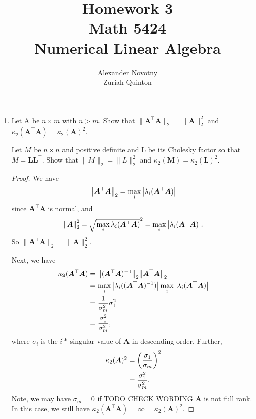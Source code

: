 \documentclass{article}
\title{Homework 3\\{\large Math 5424}\\{\large Numerical Linear Algebra}}
\author{Alexander Novotny\\Zuriah Quinton}
\theoremstyle{definition}
\newcommand{\mat}[1]{\bm{#1}}
\begin{document}
\maketitle

\begin{enumerate}[leftmargin=\labelsep]
	\item Let A be \(n \times m\) with \(n > m\). Show that \(\|\mat{A}^\top\mat{A}\|_2 = \|\mat{A}\|_2^2\) and \(\kappa_2 (\mat{A}^\top\mat{A}) = \kappa_2 (\mat{A})^2\).

	      Let \(M\) be \(n \times n\) and positive definite and L be its Cholesky factor so that \(M = \mat{L}\mat{L}^\top\). Show that \(\|M\|_2 = \|L\|_2^2\) and \(\kappa_2(\mat{M}) = \kappa_2(\mat{L})^2\).
	      \begin{proof}
				We have 
				\begin{equation*}
					\norm{\mat{A}^\top \mat{A}}_2 = \max_i \abs{ \lambda_i(\mat{A}^\top \mat{A}) } %
				\end{equation*}
				since \(\mat{A}^\top \mat{A}\) is normal, and
				\begin{equation*}
					\norm{\mat{A}}^2_2 = \sqrt{ \max_i \lambda_i(\mat{A}^\top \mat{A}) } ^2= \max_i \abs{ \lambda_i(\mat{A}^\top \mat{A}) }.
				\end{equation*}
				So \(\|\mat{A}^\top\mat{A}\|_2 = \|\mat{A}\|_2^2\).

				Next, we have 
				\begin{align*}
					\kappa_2(\mat{A}^\top \mat{A}) & = \norm{(\mat{A}^\top \mat{A})^{-1}}_2 \norm{\mat{A}^\top \mat{A}}_2 \\
					                               & = \max_i \abs{ \lambda_i((\mat{A}^\top \mat{A})^{-1} )} \max_i \abs{ \lambda_i(\mat{A}^\top \mat{A}) } \\
									               & = \frac{1}{\sigma_m^2} \sigma_1^2 \\
									               & = \frac{\sigma_1^2}{\sigma_m^2},
				\end{align*}
				where \(\sigma_i\) is the \(i^{\text{th}}\) singular value of \(\mat{A}\) in descending order. Further,
				\begin{align*}
					\kappa_2(\mat{A})^2 & = \qty(\frac{\sigma_1}{\sigma_m})^2 \\
					                    & = \frac{\sigma_1^2}{\sigma_m^2}.
				\end{align*}
				Note, we may have \(\sigma_m=0\) if TODO CHECK WORDING \(\mat{A}\) is not full rank. In this case, we still have \(\kappa_2(\mat{A}^\top \mat{A})=\infty=\kappa_2(\mat{A})^2\).


\end{proof}
\end{enumerate}
\end{document}
